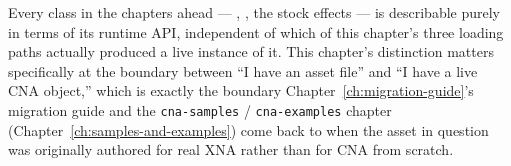 Every class in the chapters ahead --- , , the stock
effects --- is describable purely in terms of its runtime API, independent of which of this
chapter's three loading paths actually produced a live instance of it. This chapter's
distinction matters specifically at the boundary between ``I have an asset file'' and ``I have
a live CNA object,'' which is exactly the boundary Chapter~\ref{ch:migration-guide}'s migration guide and the
\texttt{cna-samples} / \texttt{cna-examples} chapter (Chapter~\ref{ch:samples-and-examples})
come back to when the asset in
question was originally authored for real XNA rather than for CNA from scratch.

